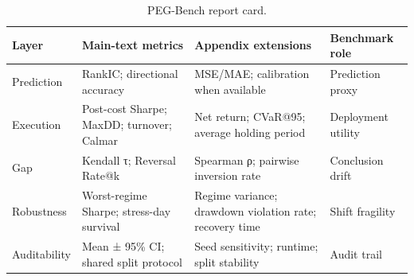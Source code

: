 \begin{table}[t]
\centering
\caption{PEG-Bench report card.}
\label{tab:table_12_report_card}
\begin{tabular}{llll}
\toprule
Layer & Main-text metrics & Appendix extensions & Benchmark role \\
\midrule
Prediction & RankIC; directional accuracy & MSE/MAE; calibration when available & Prediction proxy \\
Execution & Post-cost Sharpe; MaxDD; turnover; Calmar & Net return; CVaR@95; average holding period & Deployment utility \\
Gap & Kendall τ; Reversal Rate@k & Spearman ρ; pairwise inversion rate & Conclusion drift \\
Robustness & Worst-regime Sharpe; stress-day survival & Regime variance; drawdown violation rate; recovery time & Shift fragility \\
Auditability & Mean ± 95\% CI; shared split protocol & Seed sensitivity; runtime; split stability & Audit trail \\
\bottomrule
\end{tabular}
\end{table}
